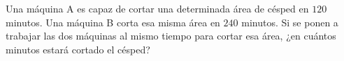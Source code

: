 Una máquina A es capaz de cortar una determinada área de césped en $120$ minutos. Una máquina B corta esa misma área en $240$ minutos. Si se ponen a trabajar las dos máquinas al mismo tiempo para cortar esa área, ¿en cuántos minutos estará cortado el césped?